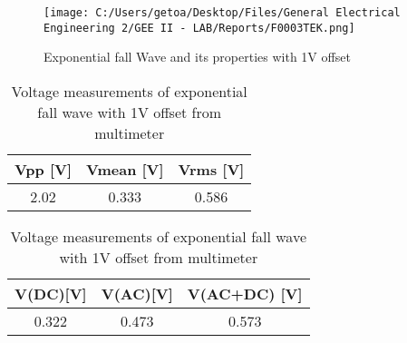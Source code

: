 \documentclass[12pt]{report}
\begin{document}
\begin{figure}[!ht]
  \centering
  \texttt{[image: C:/Users/getoa/Desktop/Files/General Electrical Engineering 2/GEE II - LAB/Reports/F0003TEK.png]}
  \caption{Exponential fall Wave and its properties with 1V offset}
\end{figure} 
\begin{table}[ht]
\centering
\begin{minipage}{0.8\linewidth}
\centering
\begin{tabular}{|c|c|c|}
\hline
\rowcolor{lightblue} Vpp [V] & Vmean [V] & Vrms [V] \\
\hline
2.02 & 0.333 & 0.586 \\
\hline
\end{tabular}
\caption{Voltage measurements of exponential fall wave with 1V offset from oscilloscope \\}
\label{tab:voltage1b} 
\end{minipage}
\hfill
\begin{minipage}{0.8\linewidth}
\centering
\begin{tabular}{|c|c|c|}
\hline
\rowcolor{lightblue} V(DC)[V] & V(AC)[V] & V(AC+DC) [V] \\
\hline
0.322 & 0.473 & 0.573 \\
\hline
\end{tabular}
\caption{Voltage measurements of exponential fall wave with 1V offset from multimeter}
\end{minipage}
\end{table}
\FloatBarrier %
\end{document}
